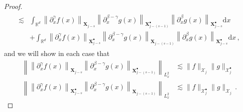 \documentclass[10pt]{amsart}
\theoremstyle{definition}\newtheorem{defi}[theo]{Definition}\newtheorem{rema}[theo]{Remark}\newtheorem{exam}[theo]{Example}\newtheorem{exem}[theo]{Example}\newtheorem{nota}[theo]{Notation}
\renewcommand{\d}{\mathrm{d}}
\newcommand{\R}{\mathbb{R}}
\newcommand{\XX}{\mathcal{X}}
\newcommand{\Sh}{\bm{X}}
\newcommand{\Shp}{\bm{X}^{\bullet}}
\newcommand{\SSh}{\bm{\XX}}
\newcommand{\SShp}{\bm{\XX}^{\bullet}}
\begin{document}
\begin{proof}
\begin{multline}
\begin{aligned}
\lesssim & \int_{\R^{d}} \left\| \partial_x^\gamma f(x)\right\|_{ \Sh_{j-s} } \left\| \partial_x^{\beta-\gamma} g(x) \right\|_{ \Shp_{j - (s-1) } } \left\| \partial_x^\beta g(x) \right\|_{ \Shp_{j - s } } \d x \\
& + \int_{\R^{d}} \left\| \partial_x^\gamma f(x) \right\|_{ \Shp_{j-s} } \left\| \partial_x^{\beta-\gamma} g(x) \right\|_{ \Sh_{j - (s-1) } } \left\| \partial_x^\beta g(x) \right\|_{ \Shp_{j - s } } \d x \,,
\end{aligned}
\end{multline}
and we will show in each case that
\begin{equation}\label{eq:degenerate_bilinear_goal}
\begin{split}
\left\|\left\| \partial_x^\gamma f(x) \right\|_{ \Sh_{j-s} } \left\| \partial_x^{\beta-\gamma} g(x) \right\|_{ \Shp_{j - (s-1) } } \right\|_{L^{2}_{x}} &\lesssim \|f\|_{\SSh_{j}}\|g\|_{\SShp_{j}}\\
\left\|\left\| \partial_x^\gamma f(x) \right\|_{ \Shp_{j-s} } \left\| \partial_x^{\beta-\gamma} g(x) \right\|_{ \Sh_{j - (s-1) } } \right\|_{L^{2}_{x}} &\lesssim \|f\|_{\SShp_{j}}\|g\|_{\SSh_{j}}\,.
\end{split}
\end{equation}


\end{proof}
\end{document}
